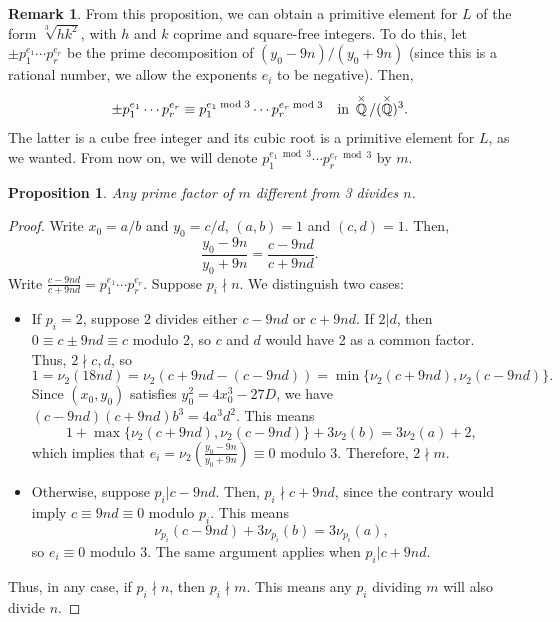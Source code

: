 \documentclass[oneside]{amsart}
\newcommand{\embrace}[3]{\left#1 #3 \right#2}
\newcommand{\lpar}[1]{\embrace{(}{)}{#1}}
\DeclareMathOperator{\QQ}{\mathbb{Q}}
\newtheorem{proposition}[X]{Proposition}
\theoremstyle{definition}
\newtheorem{remark}[X]{Remark}
\begin{document}
\begin{remark}
    From this proposition, we can obtain a primitive element for $L$ of the form $\sqrt[3]{hk^2}$, with $h$ and $k$ coprime and square-free integers. To do this, let $\pm p_1^{e_1}\cdots p_r^{e_r}$ be the prime decomposition of $(y_0 - 9n)/(y_0 + 9n)$ (since this is a rational number, we allow the exponents $e_i$ to be negative). Then, 
    $$
    \pm p_1^{e_1}\cdots p_r^{e_r} \equiv p_1^{e_1\bmod 3}\cdots p_r^{e_r\bmod 3} \quad \textnormal{in }\QQ^{\times}/(\QQ^{\times})^3.
    $$
    The latter is a cube free integer and its cubic root is a primitive element for $L$, as we wanted. From now on, we will denote $p_1^{e_1\bmod 3}\cdots p_r^{e_r\bmod 3}$ by $m$.
\end{remark}
\begin{proposition}
    \label{proposition: factors of n}
    Any prime factor of $m$ different from 3 divides $n$.
\end{proposition}
\begin{proof}
    Write $x_0 = a/b$ and $y_0 = c/d$, $(a,b) = 1$ and $(c,d) = 1$. Then,
    $$
    \frac{y_0 - 9n}{y_0 + 9n} = \frac{c - 9nd}{c + 9nd}.
    $$
    Write $\frac{c - 9nd}{c + 9nd} = p_1^{e_1}\cdots p_r^{e_r}$. Suppose $p_i \nmid n$. We distinguish two cases: 
    \begin{itemize}
        \item If $p_i = 2$, suppose $2$ divides either $c - 9nd$ or $c + 9nd$. If $2 | d$, then $0 \equiv c \pm 9nd \equiv c$ modulo 2, so $c$ and $d$ would have 2 as a common factor. Thus, $2 \nmid c, d$, so 
        $$
        1 = \nu_2(18nd) = \nu_2(c + 9nd - (c - 9nd)) = \min\{\nu_2(c + 9nd), \nu_2(c - 9nd)\}.
        $$
        Since $(x_0, y_0)$ satisfies $y_0^2 = 4x_0^3 - 27D$, we have $(c - 9nd)(c + 9nd)b^3 = 4a^3d^2$. This means
        $$
        1 + \max\{\nu_2(c + 9nd), \nu_2(c - 9nd)\} + 3\nu_2(b) = 3\nu_2(a) + 2,
        $$
        which implies that $e_i = \nu_2\lpar{\frac{y_0 - 9n}{y_0 + 9n}} \equiv 0$ modulo 3. Therefore, $2 \nmid m$.
        \item Otherwise, suppose $p_i | c - 9nd$. Then, $p_i\nmid c + 9nd$, since the contrary would imply $c \equiv 9nd \equiv 0$ modulo $p_i$. This means 
        $$
        \nu_{p_i}(c - 9nd) + 3\nu_{p_i}(b) = 3\nu_{p_i}(a),
        $$
        so $e_i \equiv 0$ modulo 3. The same argument applies when $p_i|c + 9nd$.
    \end{itemize}
    Thus, in any case, if $p_i \nmid n$, then $p_i\nmid m$. This means any $p_i$ dividing $m$ will also divide $n$. 
\end{proof}
\end{document}
